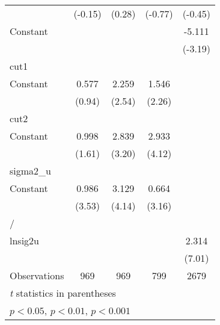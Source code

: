 {\begin{longtable}{l*{4}{c}}
                &  (-0.15)         &   (0.28)         &  (-0.77)         &  (-0.45)         \\
\addlinespace
Constant        &                  &                  &                  &   -5.111\sym{**} \\
                &                  &                  &                  &  (-3.19)         \\
\midrule
cut1            &                  &                  &                  &                  \\
Constant        &    0.577         &    2.259\sym{*}  &    1.546\sym{*}  &                  \\
                &   (0.94)         &   (2.54)         &   (2.26)         &                  \\
\midrule
cut2            &                  &                  &                  &                  \\
Constant        &    0.998         &    2.839\sym{**} &    2.933\sym{***}&                  \\
                &   (1.61)         &   (3.20)         &   (4.12)         &                  \\
\midrule
sigma2\_u        &                  &                  &                  &                  \\
Constant        &    0.986\sym{***}&    3.129\sym{***}&    0.664\sym{**} &                  \\
                &   (3.53)         &   (4.14)         &   (3.16)         &                  \\
\midrule
/               &                  &                  &                  &                  \\
lnsig2u         &                  &                  &                  &    2.314\sym{***}\\
                &                  &                  &                  &   (7.01)         \\
\midrule
Observations    &      969         &      969         &      799         &     2679         \\
\bottomrule
\multicolumn{5}{l}{\footnotesize \textit{t} statistics in parentheses}\\
\multicolumn{5}{l}{\footnotesize \sym{*} \(p<0.05\), \sym{**} \(p<0.01\), \sym{***} \(p<0.001\)}\\
\end{longtable}
}
